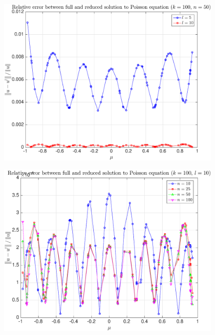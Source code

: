 \documentclass[11pt,a4paper]{article}
\theoremstyle{definition}
\theoremstyle{theorem}
\numberwithin{equation}{section}
\begin{document}
	\begin{figure}[H]
		\center
		\includegraphics[scale = 0.5]{fig22}
		\caption{}
	\end{figure}
	
	\begin{figure}[H]
		\center
		\includegraphics[scale = 0.5]{fig23}
		\caption{}
	\end{figure}
	
\end{document}
